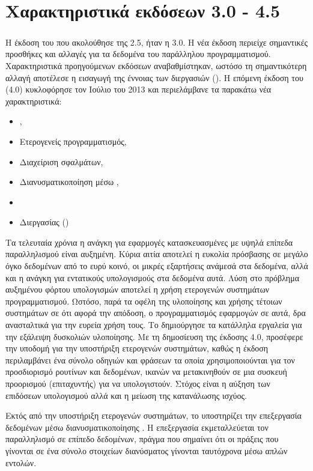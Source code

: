 \section{Χαρακτηριστικά εκδόσεων  3.0 - 4.5}
\subparagraph{}
Η έκδοση του \emph{} που ακολούθησε της 2.5, ήταν η 3.0. Η νέα έκδοση περιείχε σημαντικές προσθήκες και
αλλαγές για τα δεδομένα του παράλληλου προγραμματισμού. Χαρακτηριστικά προηγούμενων εκδόσεων αναβαθμίστηκαν, ωστόσο τη
σημαντικότερη αλλαγή αποτέλεσε η εισαγωγή της έννοιας των διεργασιών (\textbf{}). Η επόμενη έκδοση του
\emph{} (4.0) κυκλοφόρησε τον Ιούλιο του 2013 και περιελάμβανε τα παρακάτω νέα χαρακτηριστικά:

\begin{itemize}
    \item \emph{},
    \item Ετερογενείς προγραμματισμός,
    \item Διαχείριση σφαλμάτων,
    \item Διανυσματικοποίηση μέσω \emph{},
    \item \emph{}
    \item Διεργασίας (\emph{})
\end{itemize}

Τα τελευταία χρόνια η ανάγκη για εφαρμογές κατασκευασμένες με υψηλά επίπεδα παραλληλισμού είναι αυξημένη. Κύρια αιτία
αποτελεί η ευκολία πρόσβασης σε μεγάλο όγκο δεδομένων από το ευρύ κοινό, οι μικρές εξαρτήσεις ανάμεσά στα δεδομένα, αλλά
και η ανάγκη για εντατικούς υπολογισμούς στα δεδομένα αυτά. Λύση στο πρόβλημα αυξημένου φόρτου υπολογισμών αποτελεί η
χρήση ετερογενών συστημάτων προγραμματισμού. Ωστόσο, παρά τα οφέλη της υλοποίησης και χρήσης τέτοιων συστημάτων σε ότι
αφορά την απόδοση, ο προγραμματισμός εφαρμογών σε αυτά, δρα ανασταλτικά για την ευρεία χρήση τους. Το \emph{}
δημιούργησε τα κατάλληλα εργαλεία για την εξάλειψη δυσκολιών υλοποίησης. Με τη δημοσίευση της έκδοσης 4.0, προσέφερε την
υποδομή για την υποστήριξη ετερογενών συστημάτων, καθώς η έκδοση περιλαμβάνει ένα σύνολο οδηγιών και φράσεων τα οποία
χρησιμοποιούνται για τον προσδιορισμό ρουτίνων και δεδομένων, ικανών να μετακινηθούν σε μια συσκευή προορισμού
(επιταχυντής) για να υπολογιστούν. Στόχος είναι η αύξηση των επιδόσεων υπολογισμού αλλά και η μείωση της κατανάλωσης
ισχύος. 

Εκτός από την υποστήριξη ετερογενών συστημάτων, το \emph{} υποστηρίζει την επεξεργασία δεδομένων μέσω
διανυσματικοποίησης \emph{}. Η επεξεργασία \emph{} εκμεταλλεύεται
τον παραλληλισμό σε επίπεδο δεδομένων, πράγμα που σημαίνει ότι οι πράξεις που γίνονται σε ένα σύνολο στοιχείων
διανύσματος γίνονται ταυτόχρονα μέσω απλών εντολών.

